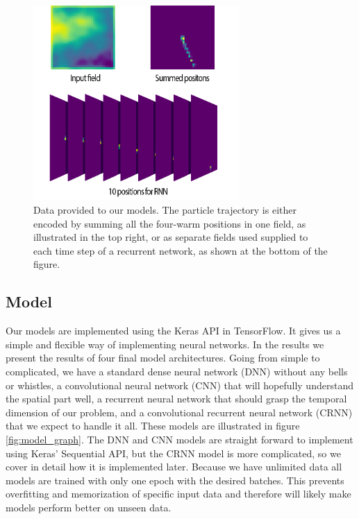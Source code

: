 \documentclass[a4paper]{article}
\begin{document}
\begin{figure}
    \centering
    \includegraphics[width=0.7\textwidth]{Figures/Positions_vis.png}
    \caption{Data provided to our models. The particle trajectory is either encoded by summing all the four-warm positions in one field, as illustrated in the top right, or as separate fields used supplied to each time step of a recurrent network, as shown at the bottom of the figure.}
    \label{fig:position_input}
\end{figure}

\subsection{Model}
Our models are implemented using the Keras API in TensorFlow. It gives us a simple and flexible way of implementing neural networks. In the results we present the results of four final model architectures. Going from simple to complicated, we have a standard dense neural network (DNN) without any bells or whistles, a convolutional neural network (CNN) that will hopefully understand the spatial part well, a recurrent neural network that should grasp the temporal dimension of our problem, and a convolutional recurrent neural network (CRNN) that we expect to handle it all. These models are illustrated in figure \ref{fig:model_graph}. The DNN and CNN models are straight forward to implement using Keras' Sequential API, but the CRNN model is more complicated, so we cover in detail how it is implemented later. Because we have unlimited data all models are trained with only one epoch with the desired batches. This prevents overfitting and memorization of specific input data and therefore will likely make models perform better on unseen data.
\end{document}
